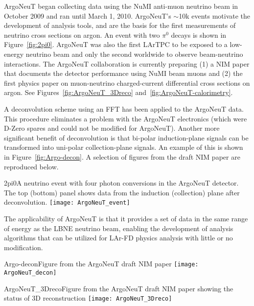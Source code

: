 ArgoNeuT began collecting data using the NuMI anti-muon neutrino beam in October 2009 and ran until  March 1, 2010.  ArgoNeuT's $\sim$10k events motivate the development of analysis tools, and are the basis for the first measurements of neutrino cross sections on argon.   An event with two $\pi^{0}$ decays is shown in Figure~\ref{fig:2pi0}.   ArgoNeuT was also the first LArTPC to be exposed to a low-energy neutrino beam and only the second worldwide to observe beam-neutrino interactions. The ArgoNeuT collaboration is currently preparing (1) a NIM paper that documents the detector performance using NuMI beam muons and (2) the first physics paper on muon-neutrino charged-current differential cross sections on argon.  See Figures~\ref{fig:ArgoNeuT_3Dreco} and~\ref{fig:ArgoNeuT-calorimetry}.

A deconvolution scheme using an FFT has been applied to the ArgoNeuT data. This procedure eliminates a problem with the ArgoNeuT electronics (which were D-Zero spares and could not be modified for ArgoNeuT). Another more significant benefit of deconvolution is that bi-polar induction-plane signals can be transformed into uni-polar collection-plane signals. An example of this is shown in Figure~\ref{fig:Argo-decon}. A selection of figures from the draft NIM paper are reproduced below.


\begin{cdrfigure}{2pi0}{A neutrino event with four photon conversions in the ArgoNeuT detector. The top (bottom) panel shows data from the induction (collection) plane after deconvolution.}
\texttt{[image: ArgoNeuT\_event]}
\end{cdrfigure}


The applicability of ArgoNeuT is that it provides a set of data in the same range of energy as the LBNE neutrino beam, enabling the development of analysis algorithms that can be utilized for LAr-FD physics analysis with little or no modification.


\begin{cdrfigure}{Argo-decon}{Figure from the ArgoNeuT draft NIM paper}
\texttt{[image: ArgoNeuT\_decon]}
\end{cdrfigure} %

\begin{cdrfigure}{ArgoNeuT_3Dreco}{Figure from the ArgoNeuT draft NIM paper showing the status of 3D reconstruction}
\texttt{[image: ArgoNeuT\_3Dreco]}
\end{cdrfigure}%

